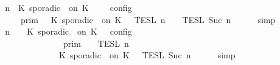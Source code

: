 \begin{isabellebody}
\isamarkupfalse%
\ {\isacharminus}\isanewline
\ \ \isamarkupfalse%
\ {\isacartoucheopen}{\isasymlbrakk}\ {\isasymGamma}{\isacharcomma}\ n\ {\isasymturnstile}\ {\isacharparenleft}K\ sporadic\ {\isasymtau}\ on\ K\ {\isacharhash}\ {\isasymPsi}\ {\isasymtriangleright}\ {\isasymPhi}\ {\isasymrbrakk}\isactrlsub c\isactrlsub o\isactrlsub n\isactrlsub f\isactrlsub i\isactrlsub g\isanewline
\ \ \ \ \ \ \ \ {\isacharequal}\ {\isasymlbrakk}{\isasymlbrakk}\ {\isasymGamma}\ {\isasymrbrakk}{\isasymrbrakk}\isactrlsub p\isactrlsub r\isactrlsub i\isactrlsub m\ {\isasyminter}\ {\isasymlbrakk}{\isasymlbrakk}\ {\isacharparenleft}K\ sporadic\ {\isasymtau}\ on\ K\ {\isacharhash}\ {\isasymPsi}\ {\isasymrbrakk}{\isasymrbrakk}\isactrlsub T\isactrlsub E\isactrlsub S\isactrlsub L\isactrlbsup {\isasymge}\ n\isactrlesup \ {\isasyminter}\ {\isasymlbrakk}{\isasymlbrakk}\ {\isasymPhi}\ {\isasymrbrakk}{\isasymrbrakk}\isactrlsub T\isactrlsub E\isactrlsub S\isactrlsub L\isactrlbsup {\isasymge}\ Suc\ n\isactrlesup {\isacartoucheclose}\isanewline
\ \ \ \ \isamarkupfalse%
\ simp\isanewline
\ \ \isamarkupfalse%
\ \isamarkupfalse%
\ {\isacartoucheopen}{\isasymlbrakk}\ {\isasymGamma}{\isacharcomma}\ n\ {\isasymturnstile}\ {\isasymPsi}\ {\isasymtriangleright}\ {\isacharparenleft}{\isacharparenleft}K\ sporadic\ {\isasymtau}\ on\ K\ {\isacharhash}\ {\isasymPhi}{\isacharparenright}\ {\isasymrbrakk}\isactrlsub c\isactrlsub o\isactrlsub n\isactrlsub f\isactrlsub i\isactrlsub g\isanewline
\ \ \ \ \ \ \ \ \ \ \ \ \ \ \ \ \ {\isacharequal}\ \ {\isasymlbrakk}{\isasymlbrakk}\ {\isasymGamma}\ {\isasymrbrakk}{\isasymrbrakk}\isactrlsub p\isactrlsub r\isactrlsub i\isactrlsub m\ {\isasyminter}\ {\isasymlbrakk}{\isasymlbrakk}\ {\isasymPsi}\ {\isasymrbrakk}{\isasymrbrakk}\isactrlsub T\isactrlsub E\isactrlsub S\isactrlsub L\isactrlbsup {\isasymge}\ n\isactrlesup \isanewline
\ \ \ \ \ \ \ \ \ \ \ \ \ \ \ \ \ \ {\isasyminter}\ {\isasymlbrakk}{\isasymlbrakk}\ {\isacharparenleft}K\ sporadic\ {\isasymtau}\ on\ K\ {\isacharhash}\ {\isasymPhi}\ {\isasymrbrakk}{\isasymrbrakk}\isactrlsub T\isactrlsub E\isactrlsub S\isactrlsub L\isactrlbsup {\isasymge}\ Suc\ n\isactrlesup {\isacartoucheclose}\isanewline
\ \ \ \ \isamarkupfalse%
\ simp\isanewline

\end{isabellebody}
